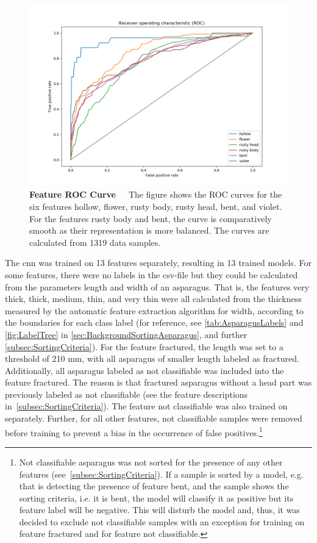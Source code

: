 \begin{figure}[!htb]
	\centering
	\includegraphics[scale=0.6]{Figures/chapter04/singellabelROC.png}
	\decoRule
	\caption[Single-Label CNN ROC Curve]{\textbf{Feature ROC Curve}~~~The figure shows the ROC curves for the six features hollow, flower, rusty body, rusty head, bent, and violet. For the features rusty body and bent, the curve is comparatively smooth as their representation is more balanced. The curves are calculated from 1319 data samples.}
	\label{fig:SingleLabelROC}
\end{figure}

The \acrshort{cnn} was trained on 13 features separately, resulting in 13 trained models. For some features, there were no labels in the csv-file but they could be calculated from the parameters length and width of an asparagus. That is, the features very thick, thick, medium, thin, and very thin were all calculated from the thickness measured by the automatic feature extraction algorithm for width, according to the boundaries for each class label (for reference, see \autoref{tab:AsparagusLabels} and \autoref{fig:LabelTree} in \autoref{sec:BackgroundSortingAsparagus}, and further \autoref{subsec:SortingCriteria}). For the feature fractured, the length was set to a threshold of 210 mm, with all asparagus of smaller length labeled as fractured. Additionally, all asparagus labeled as not classifiable was included into the feature fractured. The reason is that fractured asparagus without a head part was previously labeled as not classifiable (see the feature descriptions in~\autoref{subsec:SortingCriteria}). The feature not classifiable was also trained on separately. Further, for all other features, not classifiable samples were removed before training to prevent a bias in the occurrence of false positives.\footnote{Not classifiable asparagus was not sorted for the presence of any other features (see~\autoref{subsec:SortingCriteria}). If a sample is sorted by a model, e.g. that is detecting the presence of feature bent, and the sample shows the sorting criteria, i.e. it is bent, the model will classify it as positive but its feature label will be negative. This will disturb the model and, thus, it was decided to exclude not classifiable samples with an exception for training on feature fractured and for feature not classifiable.}

